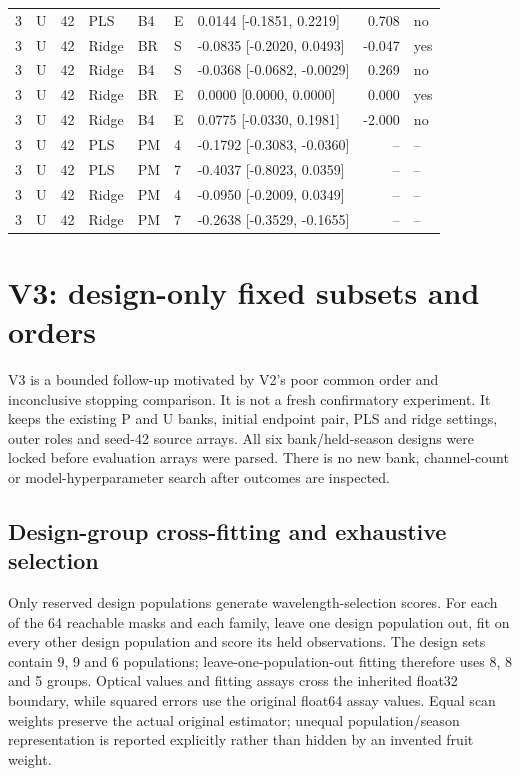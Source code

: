 \documentclass[10pt,a4paper]{article}
\begin{document}
\begin{landscape}
\begin{longtable}{rlrllllrl}
3 & U & 42 & PLS & B4 & E & 0.0144 [-0.1851, 0.2219] & 0.708 & no \\
3 & U & 42 & Ridge & BR & S & -0.0835 [-0.2020, 0.0493] & -0.047 & yes \\
3 & U & 42 & Ridge & B4 & S & -0.0368 [-0.0682, -0.0029] & 0.269 & no \\
3 & U & 42 & Ridge & BR & E & 0.0000 [0.0000, 0.0000] & 0.000 & yes \\
3 & U & 42 & Ridge & B4 & E & 0.0775 [-0.0330, 0.1981] & -2.000 & no \\
3 & U & 42 & PLS & PM & 4 & -0.1792 [-0.3083, -0.0360] & -- & -- \\
3 & U & 42 & PLS & PM & 7 & -0.4037 [-0.8023, 0.0359] & -- & -- \\
3 & U & 42 & Ridge & PM & 4 & -0.0950 [-0.2009, 0.0349] & -- & -- \\
3 & U & 42 & Ridge & PM & 7 & -0.2638 [-0.3529, -0.1655] & -- & -- \\
\end{longtable}
\endgroup
\end{landscape}

\section{V3: design-only fixed subsets and orders}
V3 is a bounded follow-up motivated by V2's poor common order and inconclusive stopping comparison. It is not a fresh confirmatory experiment. It keeps the existing P and U banks, initial endpoint pair, PLS and ridge settings, outer roles and seed-42 source arrays. All six bank/held-season designs were locked before evaluation arrays were parsed. There is no new bank, channel-count or model-hyperparameter search after outcomes are inspected.

\subsection{Design-group cross-fitting and exhaustive selection}
Only reserved design populations generate wavelength-selection scores. For each of the 64 reachable masks and each family, leave one design population out, fit on every other design population and score its held observations. The design sets contain 9, 9 and 6 populations; leave-one-population-out fitting therefore uses 8, 8 and 5 groups. Optical values and fitting assays cross the inherited float32 boundary, while squared errors use the original float64 assay values. Equal scan weights preserve the actual original estimator; unequal population/season representation is reported explicitly rather than hidden by an invented fruit weight.
\end{document}
